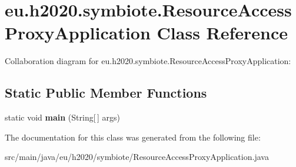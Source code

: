 \hypertarget{classeu_1_1h2020_1_1symbiote_1_1ResourceAccessProxyApplication}{}\section{eu.\+h2020.\+symbiote.\+Resource\+Access\+Proxy\+Application Class Reference}
\label{classeu_1_1h2020_1_1symbiote_1_1ResourceAccessProxyApplication}


Collaboration diagram for eu.\+h2020.\+symbiote.\+Resource\+Access\+Proxy\+Application\+:
\subsection*{Static Public Member Functions}
\begin{DoxyCompactItemize}
\item 
\mbox{\label{classeu_1_1h2020_1_1symbiote_1_1ResourceAccessProxyApplication_a6cd6b4e85788841c432b8d6276b37e8f}} 
static void {\bfseries main} (String\mbox{[}$\,$\mbox{]} args)
\end{DoxyCompactItemize}


The documentation for this class was generated from the following file\+:\begin{DoxyCompactItemize}
\item 
src/main/java/eu/h2020/symbiote/Resource\+Access\+Proxy\+Application.\+java\end{DoxyCompactItemize}
